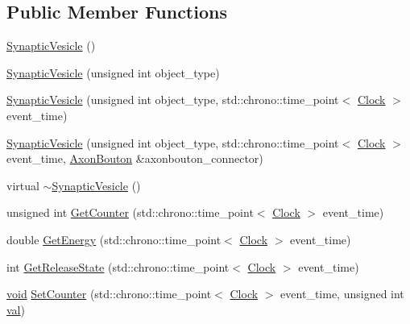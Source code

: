 \subsection*{Public Member Functions}
\begin{DoxyCompactItemize}
\item 
\mbox{\hyperlink{class_synaptic_vesicle_ac3f899ed25281a6d337ecefe1da41c67}{Synaptic\+Vesicle}} ()
\item 
\mbox{\hyperlink{class_synaptic_vesicle_aefd8a743e80077235a1c9a9fd133cc9d}{Synaptic\+Vesicle}} (unsigned int object\+\_\+type)
\item 
\mbox{\hyperlink{class_synaptic_vesicle_a6602b03ba498129b46c173e8fa66927b}{Synaptic\+Vesicle}} (unsigned int object\+\_\+type, std\+::chrono\+::time\+\_\+point$<$ \mbox{\hyperlink{universe_8h_a0ef8d951d1ca5ab3cfaf7ab4c7a6fd80}{Clock}} $>$ event\+\_\+time)
\item 
\mbox{\hyperlink{class_synaptic_vesicle_a0f86278b771137978d03bb6cf460a527}{Synaptic\+Vesicle}} (unsigned int object\+\_\+type, std\+::chrono\+::time\+\_\+point$<$ \mbox{\hyperlink{universe_8h_a0ef8d951d1ca5ab3cfaf7ab4c7a6fd80}{Clock}} $>$ event\+\_\+time, \mbox{\hyperlink{class_axon_bouton}{Axon\+Bouton}} \&axonbouton\+\_\+connector)
\item 
virtual \mbox{\hyperlink{class_synaptic_vesicle_a9bbc23a1c9757d8522a10bb28e0f575b}{$\sim$\+Synaptic\+Vesicle}} ()
\item 
unsigned int \mbox{\hyperlink{class_synaptic_vesicle_a42a3ab6704c27ca55531864c46f0fc2b}{Get\+Counter}} (std\+::chrono\+::time\+\_\+point$<$ \mbox{\hyperlink{universe_8h_a0ef8d951d1ca5ab3cfaf7ab4c7a6fd80}{Clock}} $>$ event\+\_\+time)
\item 
double \mbox{\hyperlink{class_synaptic_vesicle_a0c4d7e936023cf0f719d0a4d3f315c9c}{Get\+Energy}} (std\+::chrono\+::time\+\_\+point$<$ \mbox{\hyperlink{universe_8h_a0ef8d951d1ca5ab3cfaf7ab4c7a6fd80}{Clock}} $>$ event\+\_\+time)
\item 
int \mbox{\hyperlink{class_synaptic_vesicle_a6cc0018a0fd02cf99f1ba0ad31f495bc}{Get\+Release\+State}} (std\+::chrono\+::time\+\_\+point$<$ \mbox{\hyperlink{universe_8h_a0ef8d951d1ca5ab3cfaf7ab4c7a6fd80}{Clock}} $>$ event\+\_\+time)
\item 
\mbox{\hyperlink{glad_8h_a950fc91edb4504f62f1c577bf4727c29}{void}} \mbox{\hyperlink{class_synaptic_vesicle_a7fd7cfce5eccb904206d968866f85220}{Set\+Counter}} (std\+::chrono\+::time\+\_\+point$<$ \mbox{\hyperlink{universe_8h_a0ef8d951d1ca5ab3cfaf7ab4c7a6fd80}{Clock}} $>$ event\+\_\+time, unsigned int \mbox{\hyperlink{glad_8h_a26942fd2ed566ef553eae82d2c109c8f}{val}})

\end{DoxyCompactItemize}

